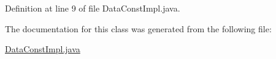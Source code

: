 Definition at line 9 of file Data\-Const\-Impl.java.

The documentation for this class was generated from the following file:\begin{CompactItemize}
\item 
\hyperlink{DataConstImpl_8java-source}{Data\-Const\-Impl.java}\end{CompactItemize}
